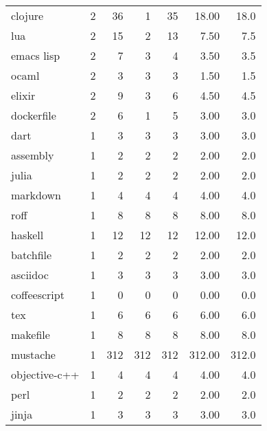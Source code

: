 \begin{tabular}{lrrrrrr}
clojure       &          2 &          36 &    1 &   35 &   18.00 &     18.0 \\
lua           &          2 &          15 &    2 &   13 &    7.50 &      7.5 \\
emacs lisp    &          2 &           7 &    3 &    4 &    3.50 &      3.5 \\
ocaml         &          2 &           3 &    3 &    3 &    1.50 &      1.5 \\
elixir        &          2 &           9 &    3 &    6 &    4.50 &      4.5 \\
dockerfile    &          2 &           6 &    1 &    5 &    3.00 &      3.0 \\
dart          &          1 &           3 &    3 &    3 &    3.00 &      3.0 \\
assembly      &          1 &           2 &    2 &    2 &    2.00 &      2.0 \\
julia         &          1 &           2 &    2 &    2 &    2.00 &      2.0 \\
markdown      &          1 &           4 &    4 &    4 &    4.00 &      4.0 \\
roff          &          1 &           8 &    8 &    8 &    8.00 &      8.0 \\
haskell       &          1 &          12 &   12 &   12 &   12.00 &     12.0 \\
batchfile     &          1 &           2 &    2 &    2 &    2.00 &      2.0 \\
asciidoc      &          1 &           3 &    3 &    3 &    3.00 &      3.0 \\
coffeescript  &          1 &           0 &    0 &    0 &    0.00 &      0.0 \\
tex           &          1 &           6 &    6 &    6 &    6.00 &      6.0 \\
makefile      &          1 &           8 &    8 &    8 &    8.00 &      8.0 \\
mustache      &          1 &         312 &  312 &  312 &  312.00 &    312.0 \\
objective-c++ &          1 &           4 &    4 &    4 &    4.00 &      4.0 \\
perl          &          1 &           2 &    2 &    2 &    2.00 &      2.0 \\
jinja         &          1 &           3 &    3 &    3 &    3.00 &      3.0 \\
\bottomrule
\end{tabular}
